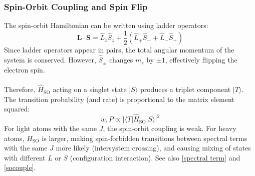\subsubsection{Spin-Orbit Coupling and Spin Flip}\label{spinflip}

The spin-orbit Hamiltonian can be written using ladder operators:
\[
\mathbf{L}\cdot\mathbf{S} = \hat{L}_z\hat{S}_z + \frac{1}{2}(\hat{L}_+\hat{S}_- + \hat{L}_-\hat{S}_+)
\]
Since ladder operators appear in pairs, the total angular momentum of the system is conserved. However, $\hat{S}_\pm$ changes $m_s$ by $\pm 1$, effectively flipping the electron spin.\\ \\
Therefore, $\hat{H}_{\text{SO}}$ acting on a singlet state $|S\rangle$ produces a triplet component $|T\rangle$. The transition probability (and rate) is proportional to the matrix element squared:
\[
w, P \propto |\langle T|\hat{H}_{\text{SO}}|S\rangle|^2
\]
For light atoms with the same $J$, the spin-orbit coupling is weak. For heavy atoms, $H_{\text{SO}}$ is larger, making spin-forbidden transitions between spectral terms with the same $J$ more likely (intersystem crossing), and causing mixing of states with different $L$ or $S$ (configuration interaction). See also \ref{spectral term} and \ref{socouple}.